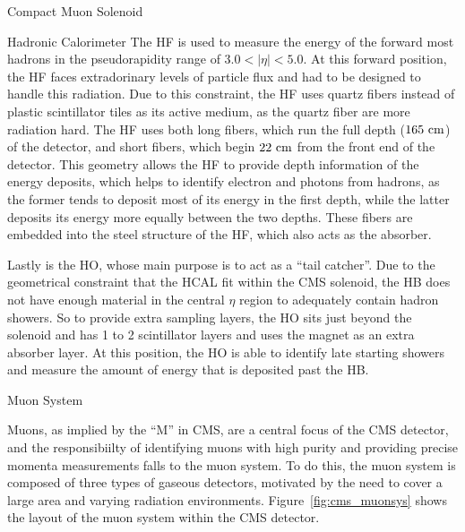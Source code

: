 \begin{section}{Compact Muon Solenoid}
\begin{subsection}{Hadronic Calorimeter}
The HF is used to measure the energy of the forward most hadrons in the pseudorapidity range of $3.0<|\eta|<5.0$.
At this forward position, the HF faces extradorinary levels of particle flux and had to be designed to handle this radiation.
Due to this constraint, the HF uses quartz fibers instead of plastic scintillator tiles as its active medium, as the quartz fiber are more radiation hard.
The HF uses both long fibers, which run the full depth ($165~\mathrm{cm}$) of the detector, and short fibers, which begin $22~\mathrm{cm}$ from the front end of the detector.
This geometry allows the HF to provide depth information of the energy deposits, which helps to identify electron and photons from hadrons, as the former tends to deposit most of its energy in the first depth, while the latter deposits its energy more equally between the two depths.
These fibers are embedded into the steel structure of the HF, which also acts as the absorber.

Lastly is the HO, whose main purpose is to act as a ``tail catcher''. 
Due to the geometrical constraint that the HCAL fit within the CMS solenoid, the HB does not have enough material in the central $\eta$ region to adequately contain hadron showers.
So to provide extra sampling layers, the HO sits just beyond the solenoid and has 1 to 2 scintillator layers and uses the magnet as an extra absorber layer. 
At this position, the HO is able to identify late starting showers and measure the amount of energy that is deposited past the HB.

\end{subsection}

\begin{subsection}{Muon System}

Muons, as implied by the ``M'' in CMS, are a central focus of the CMS detector, and the responsibiilty of identifying muons with high purity and providing precise momenta measurements falls to the muon system.
To do this, the muon system is composed of three types of gaseous detectors, motivated by the need to cover a large area and varying radiation environments.
Figure~\ref{fig:cms_muonsys} shows the layout of the muon system within the CMS detector.


\end{subsection}
\end{section}

